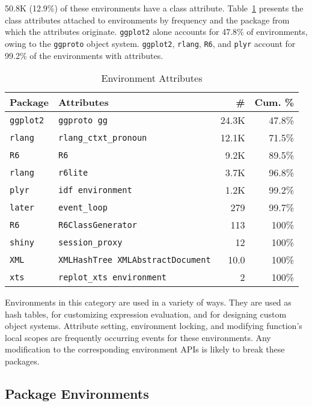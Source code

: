 \documentclass[10pt,review,sigplan,anonymous=true,authorversion=true,nonacm=true]{acmart}
\newcommand{\code}[1]{\lstinline |#1|\xspace}
\begin{document}
50.8K (12.9\%) of these environments have a class attribute.
Table~\ref{table:explicit_env_attr} presents the class attributes attached to
environments by frequency and the package from which the attributes originate.
\code{ggplot2} alone accounts for 47.8\% of environments, owing to the
\code{ggproto} object system. \code{ggplot2}, \code{rlang}, \code{R6}, and
\code{plyr} account for 99.2\% of the environments with attributes.
\begin{table}[!h]
  \small
  \caption{Environment Attributes} \label{table:explicit_env_attr}
  \centering
  \begin{tabular}{@{}ll@{}rr@{}}
    \toprule
    \textbf{Package}&\textbf{Attributes}&\textbf{\#}&\textbf{Cum. \%}\\
    \midrule
    \texttt{ggplot2}&\texttt{ggproto gg}&24.3K&47.8\%\\
    \texttt{rlang}&\texttt{rlang\_ctxt\_pronoun}&12.1K&71.5\%\\
    \texttt{R6}&\texttt{R6}&9.2K&89.5\%\\
    \texttt{rlang}&\texttt{r6lite}&3.7K&96.8\%\\
    \texttt{plyr}&\texttt{idf environment}&1.2K&99.2\%\\
    \texttt{later}&\texttt{event\_loop}&279&99.7\%\\
    \texttt{R6}&\texttt{R6ClassGenerator}&113&100\%\\
    \texttt{shiny}&\texttt{session\_proxy}&12&100\%\\
    \texttt{XML}&\texttt{XMLHashTree XMLAbstractDocument}&10.0&100\%\\
    \texttt{xts}&\texttt{replot\_xts environment}&2&100\%\\
    \bottomrule
  \end{tabular}
\end{table}

Environments in this category are used in a variety of ways. They are used as
hash tables, for customizing expression evaluation, and for designing custom
object systems. Attribute setting, environment locking, and modifying function's
local scopes are frequently occurring events for these environments. Any
modification to the corresponding environment APIs is likely to break these
packages.


\subsection{Package Environments}
\end{document}
